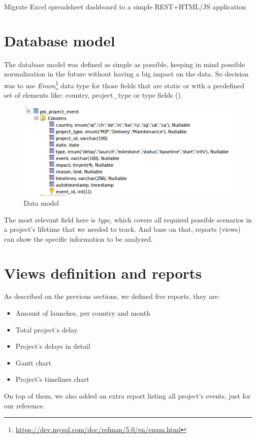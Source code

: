 \begin{part}{Migrate Excel spreadsheet dashboard to a simple REST+HTML/JS
application}
\section{Database model}
The database model was defined as simple as possible, keeping in mind
possible normalization in the future without having a big impact on the data. So
decision was to use
\emph{Enum}\footnote{\url{https://dev.mysql.com/doc/refman/5.0/en/enum.html}}
data type for those fields that are static or with a predefined set of
elements like: country, project\_type or  type fields
().

\begin{figure}[ht!]
	\centering
   	\includegraphics[width=1\textwidth]{./resources/data_model.png}
   	\caption{Data model}
   	\label{f_data_model}
\end{figure}

The most relevant field here is \emph{type}, which covers all required possible
scenarios in a project's lifetime that we needed to track. And base on that, 
reports (views) can show the specific information to be analyzed.

\section{Views definition and reports}
As described on the previous sections, we defined five reports, they are:

\begin{itemize}
  \item Amount of launches, per country and month
  \item Total project's delay
  \item Project's delays in detail
  \item Gantt chart
  \item Project's timelines chart 
\end{itemize}

On top of them, we also added an extra report listing all project's events,
just for our reference.


\end{part}

